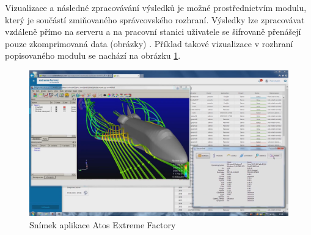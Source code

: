 \newpage
Vizualizace a následné zpracovávání výsledků je možné prostřednictvím modulu, který je součástí zmiňovaného správcovského rozhraní. Výsledky lze zpracovávat vzdáleně přímo na serveru a na pracovní stanici uživatele se šifrovaně přenášejí pouze zkomprimovaná data (obrázky) \cite{y148btMogHCsnpoe}. Příklad takové vizualizace v rozhraní popisovaného modulu se nachází na obrázku \ref{fig:atos-3d}.


\begin{figure}[!h]
	\centering
	\includegraphics[width=1\textwidth]{Figures/bull-extreme-factory.png}
	\caption{Snímek aplikace Atos Extreme Factory \cite{l9RorNxGDyQGAn8I}}
	\label{fig:atos-3d}
\end{figure}